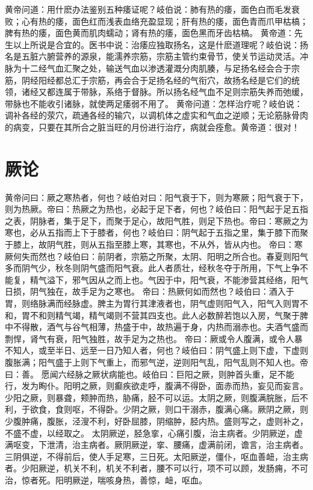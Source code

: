\documentclass[a4paper,12pt,UTF8,twoside]{ctexbook}
\begin{document}
黄帝问道：用什麽办法鉴别五种痿证呢？岐伯说：肺有热的痿，面色白而毛发衰败；心有热的痿，面色红而浅表血络充盈显现；肝有热的痿，面色青而爪甲枯槁；脾有热的痿，面色黄而肌肉蠕动；肾有热的痿，面色黑而牙齿枯槁。
黄帝道：先生以上所说是合宜的。医书中说：治痿应独取扬名，这是什麽道理呢？岐伯说：扬名是五脏六腑营养的源泉，能濡养宗筋，宗筋主管约束骨节，使关节运动灵活。冲脉为十二经气血汇聚之处，输送气血以渗透灌溉分肉肌腠，与足扬名经会合于宗筋，阴经阳经都总汇于宗筋，再会合于足扬名经的气衔穴，故扬名经是它们的统领，诸经又都连属于带脉，系络于督脉。所以扬名经气血不足则宗筋失养而弛缓，带脉也不能收引诸脉，就使两足痿弱不用了。
黄帝问道：怎样治疗呢？岐伯说：调补各经的荥穴，疏通各经的输穴，以调机体之虚实和气血之逆顺；无论筋脉骨肉的病变，只要在其所合之脏当旺的月份进行治疗，病就会痊愈。黄帝道：很对！
\chapter{厥论}
黄帝问曰：厥之寒热者，何也？岐伯对曰：阳气衰于下，则为寒厥；阳气衰于下，则为热厥。帝曰：热厥之为热也，必起于足下者，何也？岐伯曰：阳气起于足五指之表，阴脉者，集于足下，而聚于足心，故阳气胜，则足下热也。帝曰：寒厥之为寒也，必从五指而上下于膝者，何也？岐伯曰：阴气起于五指之里，集于膝下而聚于膝上，故阴气胜，则从五指至膝上寒，其寒也，不从外，皆从内也。
帝曰：寒厥何失而然也？岐伯曰：前阴者，宗筋之所聚，太阴、阳明之所合也。春夏则阳气多而阴气少，秋冬则阴气盛而阳气衰。此人者质壮，经秋冬夺于所用，下气上争不能复，精气溢下，邪气因从之而上也。气因于中，阳气衰，不能渗营其经络，阳气日损，阴气独在，故手足为之寒也。
帝曰：热厥何如而然也？岐伯曰：酒入于胃，则络脉满而经脉虚。脾主为胃行其津液者也，阴气虚则阳气入，阳气入则胃不和，胃不和则精气竭，精气竭则不营其四支也。此人必数醉若饱以入房，气聚于脾中不得散，酒气与谷气相薄，热盛于中，故热遍于身，内热而溺赤也。夫酒气盛而剽悍，肾气有衰，阳气独胜，故手足为之热也。
帝曰：厥或令人腹满，或令人暴不知人，或至半日、远至一日乃知人者，何也？岐伯曰：阴气盛上则下虚，下虚则腹胀满；阳气盛于上则下气重上，而邪气逆，逆则阳气乱，阳气乱则不知人也。帝曰：善。
愿闻六经脉之厥状病能也。岐伯曰：巨阳之厥，则肿首头重，足不能行，发为眴仆。阳明之厥，则癫疾欲走呼，腹满不得卧，面赤而热，妄见而妄言。少阳之厥，则暴聋，颊肿而热，胁痛，胫不可以运。太阴之厥，则腹满脘胀，后不利，于欲食，食则呕，不得卧。少阴之厥，则口干溺赤，腹满心痛。厥阴之厥，则少腹肿痛，腹胀，泾溲不利，好卧屈膝，阴缩肿，胫内热。盛则写之，虚则补之，不盛不虚，以经取之。
太阴厥逆，胫急挛，心痛引腹，治主病者。少阴厥逆，虚满呕变，下泄清，治主病者。厥阴厥逆，挛、腰痛，虚满前闭，谵言，治主病者。三阴俱逆，不得前后，使人手足寒，三日死。太阳厥逆，僵仆，呕血善衄，治主病者。少阳厥逆，机关不利，机关不利者，腰不可以行，项不可以顾，发肠痈，不可治，惊者死。阳明厥逆，喘咳身热，善惊，衄，呕血。
\end{document}
